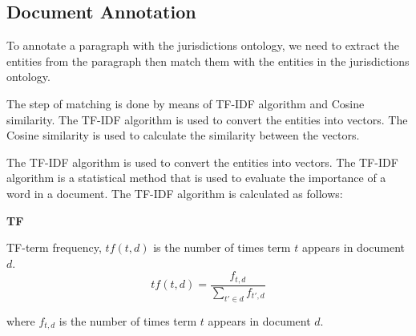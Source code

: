 \begin{algorithm}
\begin{algorithm}
{{{{{                        "authority": after\_keyword
                    \}$\;
                    \If{$after\_keyword$ in $allow\_appear\_after\_keyword$}{
                        \If{$element["agency"]$ in $agency\_and\_jurisdiction["allow"]$}{
                            $agency\_and\_jurisdiction["allow"][element["agency"]].append(element["text"][index + len(after\_keyword):])$\;
                        }
                        \Else{
                            $agency\_and\_jurisdiction["allow"][element["agency"]] \gets [element["text"][index + len(after\_keyword):]]$\;
                        }
                    }
                    \Else{
                        \If{$element["agency"]$ in $agency\_and\_jurisdiction["not\_allow"]$}{
                            $agency\_and\_jurisdiction["not\_allow"][element["agency"]].append(element["text"][index + len(after\_keyword):])$\;
                        }
                        \Else{
                            $agency\_and\_jurisdiction["not\_allow"][element["agency"]] \gets [element["text"][index + len(after\_keyword):]]$\;
                        }
                    }
                }
            }
        }
    }
\end{algorithm}

\subsection{Document Annotation}

To annotate a paragraph with the jurisdictions ontology, we need to extract the entities from the paragraph then match them with the entities in the jurisdictions ontology.

The step of matching is done by means of TF-IDF algorithm and Cosine similarity. The TF-IDF algorithm is used to convert the entities into vectors. The Cosine similarity is used to calculate the similarity between the vectors.

The TF-IDF algorithm is used to convert the entities into vectors. The TF-IDF algorithm is a statistical method that is used to evaluate the importance of a word in a document. The TF-IDF algorithm is calculated as follows:

\textbf{TF}

TF-term frequency, $tf(t, d)$ is the number of times term $t$ appears in document $d$.
$$
    tf(t, d) = \frac{f_{t,d}}{\sum_{t' \in d} f_{t',d}}
$$

where $f_{t,d}$ is the number of times term $t$ appears in document $d$.


\end{algorithm}
